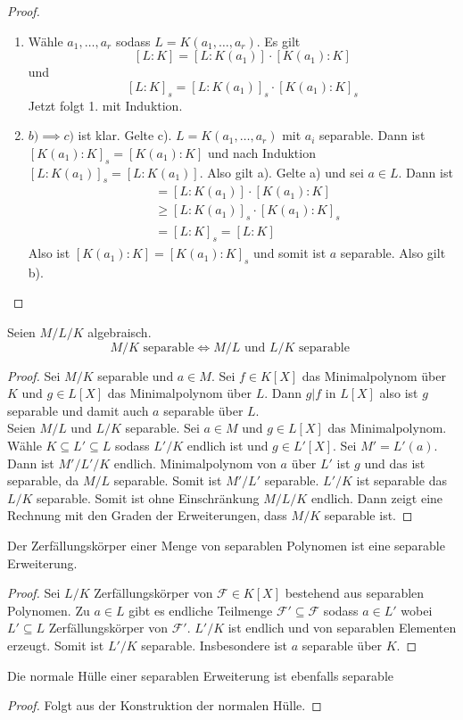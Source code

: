 \begin{proof}
   \begin{enumerate}
       \item  Wähle $a_1,\dots,a_r$ sodass $L=K(a_1,\dots,a_r)$. 
    Es gilt $$[L:K]=[L:K(a_1)]\cdot[K(a_1):K]$$ und 
    $$[L:K]_s=[L:K(a_1)]_s\cdot [K(a_1):K]_s$$
    Jetzt folgt 1. mit Induktion.
    \item $b)\implies c)$ ist klar. Gelte c). $L=K(a_1,\dots,a_r)$ mit $a_i$ separable.
    Dann ist $[K(a_1):K]_s=[K(a_1):K]$ und nach Induktion $[L:K(a_1)]_s=[L:K(a_1)]$. Also gilt a).
    Gelte a) und sei $a\in L$. Dann ist 
    \begin{align*}
        [L:K]&=[L:K(a_1)]\cdot[K(a_1):K]\\
        & \geq [L:K(a_1)]_s\cdot[K(a_1):K]_s\\
        &=[L:K]_s=[L:K]
    \end{align*}
    Also ist $[K(a_1):K]=[K(a_1):K]_s$ und somit ist $a$ separable. Also gilt b).
   \end{enumerate}
\end{proof}
\begin{Kor}
    Seien $M/L/K$ algebraisch.
    $$M/K \text{ separable}\iff M/L \text{ und } L/K\text{ separable }$$
\end{Kor}
\begin{proof}
    Sei $M/K$ separable und $a\in M$. Sei $f\in K[X]$ das Minimalpolynom über $K$ und $g\in L[X]$ das Minimalpolynom über $L$. Dann $g|f$ in $L[X]$ also ist $g$ separable und damit auch $a$ separable über $L$.\\
    Seien $M/L$ und $L/K$ separable. Sei $a\in M$ und $g\in L[X]$ das Minimalpolynom. Wähle $K\subseteq L'\subseteq L$ sodass $L'/K$ endlich ist und $g\in L'[X]$. Sei $M'=L'(a)$. Dann ist $M'/L'/K$ endlich. Minimalpolynom von $a$ über $L'$ ist $g$ und das ist separable, da $M/L$ separable. Somit ist $M'/L'$ separable. $L'/K$ ist separable das $L/K$ separable.
    Somit ist ohne Einschränkung $M/L/K$ endlich.
    Dann zeigt eine Rechnung mit den Graden der Erweiterungen, dass $M/K$ separable ist.
\end{proof}
\begin{Kor}
    Der Zerfällungskörper einer Menge von separablen Polynomen ist eine separable Erweiterung.
\end{Kor}
\begin{proof}
    Sei $L/K$ Zerfällungskörper von $\mathcal F\in K[X]$ bestehend aus separablen Polynomen. Zu $a\in L$ gibt es endliche Teilmenge $\mathcal F'\subseteq \mathcal F$ sodass $a\in L'$ wobei $L'\subseteq L$ Zerfällungskörper von $\mathcal F'.$ $L'/K$ ist endlich und von separablen Elementen erzeugt. Somit ist $L'/K$ separable. Insbesondere ist $a$ separable über $K$.
\end{proof}
\begin{Kor}
    Die normale Hülle einer separablen Erweiterung ist ebenfalls separable
\end{Kor}
\begin{proof}
    Folgt aus der Konstruktion der normalen Hülle.
\end{proof}

